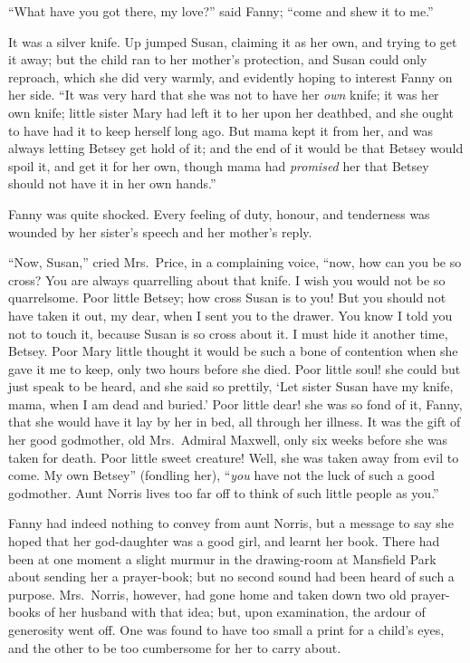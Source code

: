 \documentclass{article}
\begin{document}
``What have you got there, my love?'' said Fanny;
``come and shew it to me.''

It was a silver knife.  Up jumped Susan, claiming it
as her own, and trying to get it away; but the child ran
to her mother's protection, and Susan could only reproach,
which she did very warmly, and evidently hoping to
interest Fanny on her side.  ``It was very hard that she
was not to have her \emph{own} knife; it was her own knife;
little sister Mary had left it to her upon her deathbed,
and she ought to have had it to keep herself long ago.
But mama kept it from her, and was always letting Betsey
get hold of it; and the end of it would be that Betsey
would spoil it, and get it for her own, though mama
had \emph{promised} her that Betsey should not have it in her
own hands.''

Fanny was quite shocked.  Every feeling of duty,
honour, and tenderness was wounded by her sister's
speech and her mother's reply.

``Now, Susan,'' cried Mrs.\ Price, in a complaining voice,
``now, how can you be so cross?  You are always quarrelling
about that knife.  I wish you would not be so quarrelsome.
Poor little Betsey; how cross Susan is to you!  But you
should not have taken it out, my dear, when I sent you
to the drawer.  You know I told you not to touch it,
because Susan is so cross about it.  I must hide it
another time, Betsey.  Poor Mary little thought it would
be such a bone of contention when she gave it me to keep,
only two hours before she died.  Poor little soul! she could
but just speak to be heard, and she said so prettily, `Let sister
Susan have my knife, mama, when I am dead and buried.'
Poor little dear! she was so fond of it, Fanny, that she
would have it lay by her in bed, all through her illness.
It was the gift of her good godmother, old Mrs.\ Admiral
Maxwell, only six weeks before she was taken for death.
Poor little sweet creature!  Well, she was taken away
from evil to come.  My own Betsey'' (fondling her),
``\emph{you} have not the luck of such a good godmother.
Aunt Norris lives too far off to think of such little
people as you.''

Fanny had indeed nothing to convey from aunt Norris,
but a message to say she hoped that her god-daughter
was a good girl, and learnt her book.  There had been
at one moment a slight murmur in the drawing-room
at Mansfield Park about sending her a prayer-book;
but no second sound had been heard of such a purpose.
Mrs.\ Norris, however, had gone home and taken down two
old prayer-books of her husband with that idea; but,
upon examination, the ardour of generosity went off.
One was found to have too small a print for a child's eyes,
and the other to be too cumbersome for her to carry about.
\end{document}
